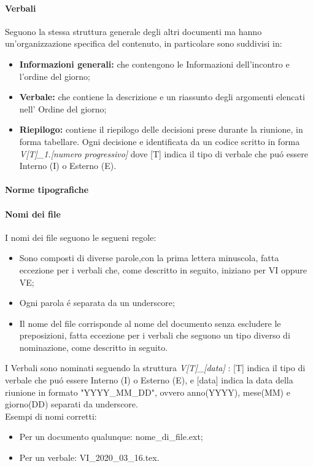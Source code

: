       \paragraph{Verbali\\}
      Seguono la stessa struttura generale degli altri documenti ma hanno un'organizzazione specifica del contenuto, in particolare sono suddivisi in:
      \begin{itemize}
        \item \textbf{Informazioni generali:} che contengono le Informazioni dell'incontro e l'ordine del giorno;
        \item \textbf{Verbale:} che contiene la descrizione e un riassunto degli argomenti elencati nell' Ordine del giorno;
        \item \textbf{Riepilogo:} contiene il riepilogo delle decisioni prese durante la riunione, in forma tabellare. Ogni decisione e identificata da un codice scritto in forma \textit{V[T]\_1.[numero progressivo]} dove [T] indica il tipo di verbale che puó essere Interno (I) o Esterno (E).
      \end{itemize}

\newpage

      \paragraph{Norme tipografiche}
      \paragraph{Nomi dei file}
      I nomi dei file seguono le segueni regole:
      \begin{itemize}
        \item Sono composti di diverse parole,con la prima lettera minuscola, fatta eccezione per i verbali che, come descritto in seguito, iniziano per VI oppure VE;
        \item Ogni parola é separata da un underscore;
        \item Il nome del file corrisponde al nome del documento senza escludere le preposizioni, fatta eccezione per i verbali che seguono un tipo diverso di nominazione, come descritto in seguito.
      \end{itemize}
      I Verbali sono nominati seguendo la struttura \textit{V[T]\_[data]} : [T] indica il tipo di verbale che puó essere Interno (I) o Esterno (E), e [data] indica la data della riunione in formato "YYYY\_MM\_DD", ovvero anno(YYYY), mese(MM) e giorno(DD) separati da underscore.\\
      Esempi di nomi corretti:
      \begin{itemize}
        \item Per un documento qualunque: nome\_di\_file.ext;
        \item Per un verbale: VI\_2020\_03\_16.tex.
      \end{itemize}

